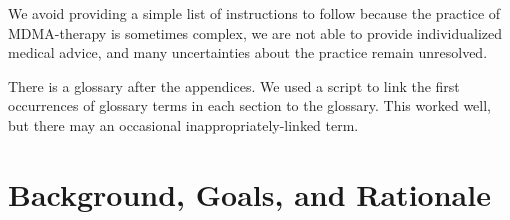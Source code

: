 \documentclass[12pt,letterpaper]{book}
\begin{document}
We avoid providing a simple list of instructions to follow because the practice of MDMA-therapy is sometimes complex, we are not able to provide individualized medical advice, and many uncertainties about the practice remain unresolved.

There is a glossary after the appendices. We used a script to link the first occurrences of glossary terms in each section to the glossary. This worked well, but there may an occasional inappropriately-linked term.

\section{Background, Goals, and Rationale}
\end{document}
